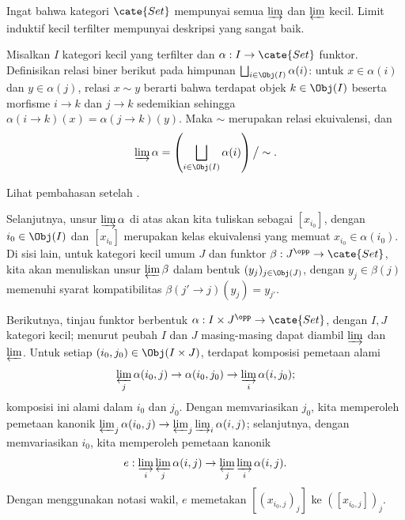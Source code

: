 Ingat bahwa kategori $\cate{Set}$ mempunyai semua $\varinjlim$ dan
$\varprojlim$ kecil. Limit induktif kecil terfilter mempunyai deskripsi yang
sangat baik.

\begin{proposisi}\label{prop:filtered-union}
	Misalkan $I$ kategori kecil yang terfilter dan
	$\alpha: I \to \cate{Set}$ funktor. Definisikan relasi biner berikut pada
	himpunan $\bigsqcup_{i \in \Obj(I)} \alpha(i)$: untuk $x \in \alpha(i)$
	dan $y \in \alpha(j)$, relasi $x \sim y$ berarti bahwa terdapat objek
	$k\in\Obj(I)$ beserta morfisme $i\rightarrow k$ dan $j\rightarrow k$
	sedemikian sehingga
	$\alpha(i \to k)(x) = \alpha(j \to k)(y)$. Maka $\sim$ merupakan relasi
	ekuivalensi, dan
	\[ \varinjlim \alpha = \left( \bigsqcup_{i \in \Obj(I)} \alpha(i) \right) \big/ \sim . \]
\end{proposisi}
\begin{bukti}
	Lihat pembahasan setelah \cite[Definisi 2.7.6]{Li1}.
\end{bukti}

Selanjutnya, unsur $\varinjlim \alpha$ di atas akan kita tuliskan sebagai
$[x_{i_0}]$, dengan $i_0 \in \Obj(I)$ dan $[x_{i_0}]$ merupakan kelas
ekuivalensi yang memuat $x_{i_0} \in \alpha(i_0)$. Di sisi lain, untuk
kategori kecil umum $J$ dan funktor $\beta: J^{\opp} \to \cate{Set}$, kita
akan menuliskan unsur $\varprojlim \beta$ dalam bentuk
$(y_j)_{j \in \Obj(J)}$, dengan $y_j \in \beta(j)$ memenuhi syarat
kompatibilitas $\beta(j' \to j)(y_j) = y_{j'}$.

Berikutnya, tinjau funktor berbentuk
$\alpha: I \times J^{\opp} \to \cate{Set}$, dengan $I, J$ kategori kecil;
menurut peubah $I$ dan $J$ masing-masing dapat diambil $\varinjlim$ dan
$\varprojlim$. Untuk setiap $(i_0, j_0) \in \Obj(I \times J)$, terdapat
komposisi pemetaan alami
\[ \varprojlim_j \alpha(i_0, j) \to \alpha(i_0, j_0) \to \varinjlim_i \alpha(i, j_0); \]
komposisi ini alami dalam $i_0$ dan $j_0$. Dengan memvariasikan $j_0$,
kita memperoleh pemetaan kanonik
$\varprojlim_j \alpha(i_0, j) \to \varprojlim_j \varinjlim_i \alpha(i, j)$;
selanjutnya, dengan memvariasikan $i_0$, kita memperoleh pemetaan kanonik
\begin{equation}\label{eqn:filtered-finite-exchange}
	e: \varinjlim_i \varprojlim_j \alpha(i, j) \to \varprojlim_j \varinjlim_i \alpha(i, j).
\end{equation}
Dengan menggunakan notasi wakil, $e$ memetakan
$\left[ (x_{i_0, j})_j \right]$ ke
$\left( [ x_{i_0, j}] \right)_j$.

